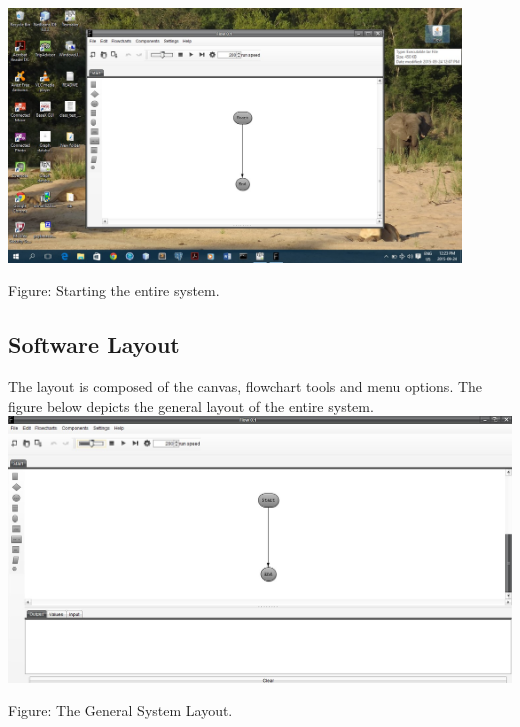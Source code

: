 \documentclass[11pt,a4paper,titlepage]{article}
\begin{document}
		\includegraphics[width=12cm]{RunningFlow.jpg}
			\begin{center}
		Figure: Starting the entire system.\newline
		\end{center} 
		
		
		
		
		
		\subsection{Software Layout}
		The layout is composed of the canvas, flowchart tools and menu options. \newline 
		The figure below depicts the general layout of the entire system. \newline \newline
		\includegraphics[width=\textwidth]{SystemLayout.jpg}
		\begin{center}
		Figure: The General System Layout.\newline
		\end{center}
		
\end{document}
